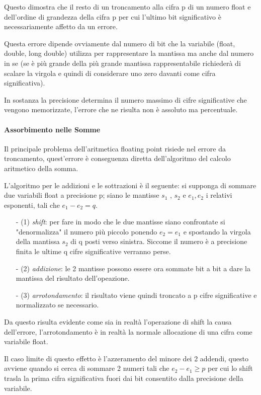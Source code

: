 \documentclass{article}
\begin{document}
Questo dimostra che il resto di un troncamento alla cifra p di un numero float e dell'ordine di grandezza della cifra p per cui l'ultimo bit significativo è necessariamente affetto da un errore.

Questa errore dipende ovviamente dal numero di bit che la variabile (float, double, long double) utilizza per rappresentare la mantissa ma anche dal numero in se (se è più grande della più grande mantissa rappresentabile richiederà di scalare la virgola e quindi di considerare uno zero davanti come cifra significativa).

In sostanza la precisione determina il numero massimo di cifre significative che vengono memorizzate, l'errore che ne risulta non è assoluto ma percentuale.

\paragraph{Assorbimento nelle Somme}

Il principale problema dell'aritmetica floating point risiede nel errore da troncamento, quest'errore è conseguenza diretta dell'algoritmo del calcolo aritmetico della somma.

L'algoritmo per le addizioni e le sottrazioni è il seguente:
si supponga di sommare due variabili float a precisione p; siano le mantisse $s_{1}$ , $s_{2}$ e $ e_{1} , e_{2}$ i relativi esponenti, tali che $ e_{1} - e_{2} = q$.
\begin{itemize}
	\item[-]	(1)	\emph{shift}: per fare in modo che le due mantisse siano confrontate si "denormalizza"  il numero più piccolo ponendo $ e_{2} = e_{1}$ e spostando la virgola della mantissa $s_{2}$ di q posti verso sinistra.
Siccome il numero è a precisione finita le ultime q cifre significative verranno perse.
	\item[-]	(2) \emph{addizione}: le 2 mantisse possono essere ora sommate bit a bit a dare la mantissa del risultato dell'opeazione.
	\item[-]	(3) \emph{arrotondamento}: il risultato viene quindi troncato a p cifre significative e normalizzato se necessario.
\end{itemize}

Da questo risulta evidente come sia in realtà l'operazione di shift la causa dell'errore, l'arrotondamento è in realtà la normale allocazione di una cifra come variabile float.

Il caso limite di questo effetto è l'azzeramento del minore dei 2 addendi, questo avviene quando si cerca di sommare 2 numeri tali che $ e_{2} - e_{1} \geq p$ per cui lo shift trasla la prima cifra significativa fuori dai bit consentito dalla precisione della variabile.
\end{document}
